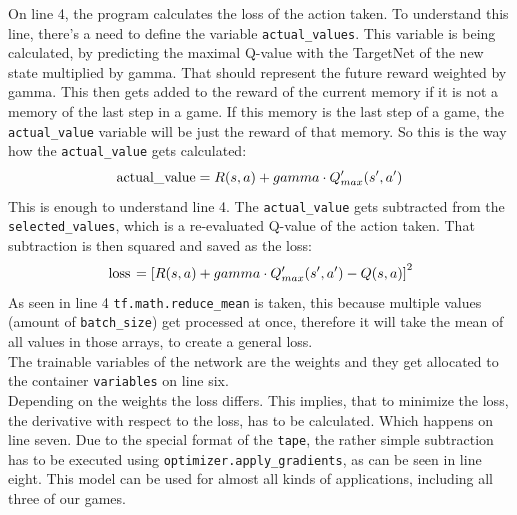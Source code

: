 \documentclass[12pt]{article}
\def\gamma{gamma}%
\begin{document}
On line 4, the program calculates the loss of the action taken. To understand this line, there's a need to define the variable \lstinline{actual_values}. This variable is being calculated, by predicting the maximal \gls{Q-value} with the \gls{TargetNet} of the new \gls{state} multiplied by \gls{gamma}. That should represent the future \gls{reward} weighted by \gls{gamma}. This then gets added to the \gls{reward} of the current \gls{memory} if it is not a \gls{memory} of the last step in a game. If this \gls{memory} is the last step of a game, the \lstinline{actual_value} variable will be just the \gls{reward} of that \gls{memory}. So this is the way how the \lstinline{actual_value} gets calculated:
\begin{equation}\nonumber
\text{\lstinline{actual_value}} = R(s, a) + \gamma \cdot Q'_{max}(s', a')
\end{equation}
This is enough to understand line 4. The \lstinline{actual_value} gets subtracted from the \lstinline{selected_values}, which is a re-evaluated \gls{Q-value} of the action taken. That subtraction is then squared and saved as the loss: 
\begin{equation}\nonumber
    \text{\lstinline{loss}} = \left [ R(s, a) + \gamma \cdot Q_{max}'(s', a') - Q(s, a) \right ]^{2}
\end{equation}
As seen in line 4 \lstinline{tf.math.reduce_mean} is taken, this because multiple values (amount of \lstinline{batch_size}) get processed at once, therefore it will take the mean of all values in those arrays, to create a general loss. \\
The trainable variables of the network are the \glspl{weight} and they get allocated to the container \lstinline{variables} on line six. \\
Depending on the \glspl{weight} the loss differs. This implies, that to minimize the loss, the derivative with respect to the loss, has to be calculated.  Which happens on line seven. Due to the special format of the \lstinline{tape}, the rather simple subtraction has to be executed using \lstinline{optimizer.apply_gradients}, as can be seen in line eight. This model can be used for almost all kinds of applications, including all three of our games. \cite{tf.keras.optimizers}

\newpage
\end{document}
